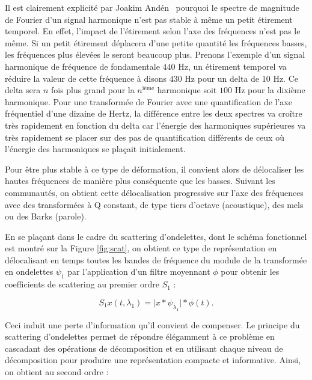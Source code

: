 Il est clairement explicité par Joakim And\'en~\cite{anden2014deep} pourquoi le spectre de magnitude de Fourier d'un signal harmonique n'est pas stable à même un petit étirement temporel. En effet, l'impact de l'étirement selon l'axe des fréquences n'est pas le même. Si un petit étirement déplacera d'une petite quantité les fréquences basses, les fréquences plus élevées le seront beaucoup plus. Prenons l'exemple d'un signal harmonique de fréquence de fondamentale $440$ Hz, un étirement temporel va réduire la valeur de cette fréquence à disons $430$ Hz pour un delta de $10$ Hz. Ce delta sera $n$ fois plus grand pour la $n^{\text{ième}}$ harmonique soit $100$ Hz pour la dixième harmonique. Pour une transformée de Fourier avec une quantification de l'axe fréquentiel d'une dizaine de Hertz, la différence entre les deux spectres va croître très rapidement en fonction du delta car l'énergie des harmoniques supérieures va très rapidement se placer sur des pas de quantification différents de ceux où l'énergie des harmoniques se plaçait initialement.

Pour être plus stable à ce type de déformation, il convient alors de \og délocaliser \fg les hautes fréquences de manière plus conséquente que les basses. Suivant les communautés, on obtient cette délocalisation progressive sur l'axe des fréquences avec des transformées à Q constant, de type tiers d'octave (acoustique), des mels ou des Barks (parole).

En se plaçant dans le cadre du scattering d'ondelettes, dont le schéma fonctionnel est montré sur la Figure \ref{fig:scat}, on obtient ce type de représentation en délocalisant en temps toutes les bandes de fréquence du module de la transformée en ondelettes $\psi_1$ par l'application d'un filtre moyennant $\phi$ pour obtenir les coefficients de scattering au premier ordre $S_1$ :

\begin{equation}
S_1{x}(t, \lambda_1)
= \vert {x} \ast {\psi_{\lambda_1}} \vert \ast \phi(t)\mbox{.}
\end{equation}

Ceci induit une perte d'information qu'il convient de compenser. Le principe du scattering d'ondelettes permet de répondre élégamment à ce problème en cascadant des opérations de décomposition et en utilisant chaque niveau de décomposition pour produire une représentation compacte et informative. Ainsi, on obtient au second ordre :

